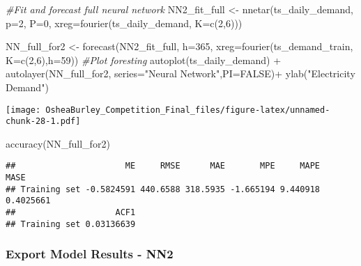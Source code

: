 \documentclass[
]{article}
\newenvironment{Shaded}{\begin{snugshade}}{\end{snugshade}}
\newcommand{\AttributeTok}[1]{\textcolor[rgb]{0.77,0.63,0.00}{#1}}
\newcommand{\CommentTok}[1]{\textcolor[rgb]{0.56,0.35,0.01}{\textit{#1}}}
\newcommand{\ConstantTok}[1]{\textcolor[rgb]{0.00,0.00,0.00}{#1}}
\newcommand{\DecValTok}[1]{\textcolor[rgb]{0.00,0.00,0.81}{#1}}
\newcommand{\FunctionTok}[1]{\textcolor[rgb]{0.00,0.00,0.00}{#1}}
\newcommand{\NormalTok}[1]{#1}
\newcommand{\OtherTok}[1]{\textcolor[rgb]{0.56,0.35,0.01}{#1}}
\newcommand{\SpecialCharTok}[1]{\textcolor[rgb]{0.00,0.00,0.00}{#1}}
\newcommand{\StringTok}[1]{\textcolor[rgb]{0.31,0.60,0.02}{#1}}
\begin{document}
\begin{Shaded}
\begin{Highlighting}[]
\CommentTok{\#Fit and forecast full neural network}
\NormalTok{NN2\_fit\_full }\OtherTok{\textless{}{-}}  \FunctionTok{nnetar}\NormalTok{(ts\_daily\_demand,}
                 \AttributeTok{p=}\DecValTok{2}\NormalTok{,}
                 \AttributeTok{P=}\DecValTok{0}\NormalTok{,}
                 \AttributeTok{xreg=}\FunctionTok{fourier}\NormalTok{(ts\_daily\_demand, }\AttributeTok{K=}\FunctionTok{c}\NormalTok{(}\DecValTok{2}\NormalTok{,}\DecValTok{6}\NormalTok{)))}

\NormalTok{NN\_full\_for2 }\OtherTok{\textless{}{-}} \FunctionTok{forecast}\NormalTok{(NN2\_fit\_full, }
                   \AttributeTok{h=}\DecValTok{365}\NormalTok{,}
                   \AttributeTok{xreg=}\FunctionTok{fourier}\NormalTok{(ts\_demand\_train, }
                                          \AttributeTok{K=}\FunctionTok{c}\NormalTok{(}\DecValTok{2}\NormalTok{,}\DecValTok{6}\NormalTok{),}\AttributeTok{h=}\DecValTok{59}\NormalTok{))}
\CommentTok{\#Plot foresting }
\FunctionTok{autoplot}\NormalTok{(ts\_daily\_demand) }\SpecialCharTok{+}
  \FunctionTok{autolayer}\NormalTok{(NN\_full\_for2, }\AttributeTok{series=}\StringTok{"Neural Network"}\NormalTok{,}\AttributeTok{PI=}\ConstantTok{FALSE}\NormalTok{)}\SpecialCharTok{+}
  \FunctionTok{ylab}\NormalTok{(}\StringTok{"Electricity Demand"}\NormalTok{) }
\end{Highlighting}
\end{Shaded}

\texttt{[image: OsheaBurley\_Competition\_Final\_files/figure-latex/unnamed-chunk-28-1.pdf]}

\begin{Shaded}
\begin{Highlighting}[]
\FunctionTok{accuracy}\NormalTok{(NN\_full\_for2)}
\end{Highlighting}
\end{Shaded}

\begin{verbatim}
##                      ME     RMSE      MAE       MPE     MAPE      MASE
## Training set -0.5824591 440.6588 318.5935 -1.665194 9.440918 0.4025661
##                    ACF1
## Training set 0.03136639
\end{verbatim}

\hypertarget{export-model-results---nn2}{%
\subsubsection{Export Model Results -
NN2}\label{export-model-results---nn2}}
\end{document}

